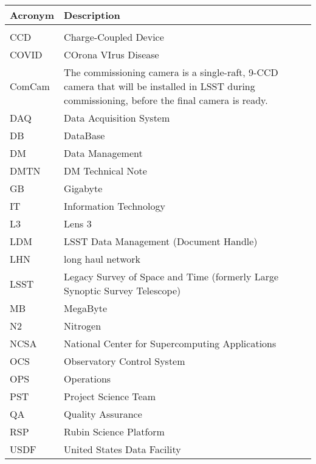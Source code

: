 \addtocounter{table}{-1}
\begin{longtable}{p{}p{}}\hline
\textbf{Acronym} & \textbf{Description}  \\\hline

 &  \\\hline
CCD & Charge-Coupled Device \\\hline
COVID & COrona VIrus Disease \\\hline
ComCam & The commissioning camera is a single-raft, 9-CCD camera that will be installed in LSST during commissioning, before the final camera is ready. \\\hline
DAQ & Data Acquisition System \\\hline
DB & DataBase \\\hline
DM & Data Management \\\hline
DMTN & DM Technical Note \\\hline
GB & Gigabyte \\\hline
IT & Information Technology \\\hline
L3 & Lens 3 \\\hline
LDM & LSST Data Management (Document Handle) \\\hline
LHN & long haul network \\\hline
LSST & Legacy Survey of Space and Time (formerly Large Synoptic Survey Telescope) \\\hline
MB & MegaByte \\\hline
N2 & Nitrogen \\\hline
NCSA & National Center for Supercomputing Applications \\\hline
OCS & Observatory Control System \\\hline
OPS & Operations \\\hline
PST & Project Science Team \\\hline
QA & Quality Assurance \\\hline
RSP & Rubin Science Platform \\\hline
USDF & United States Data Facility \\\hline
\end{longtable}
